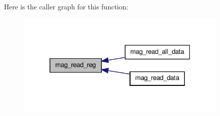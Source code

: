 Here is the caller graph for this function\-:\nopagebreak
\begin{figure}[H]
\begin{center}
\leavevmode
\includegraphics[width=292pt]{group__mag_ga6830eaeae2298320e1e8c902e4edd709_icgraph}
\end{center}
\end{figure}


